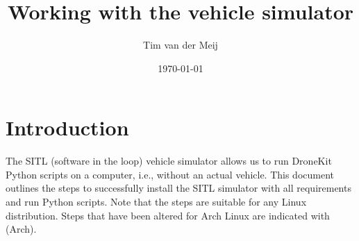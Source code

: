 \documentclass{article}
\newcommand{\arch}{{\color{red} (Arch)}}
\begin{document}
\title{Working with the vehicle simulator}
\author{Tim van der Meij}
\date{\today}

\maketitle

\section*{Introduction}
The SITL (software in the loop) vehicle simulator allows us to run DroneKit Python scripts
on a computer, i.e., without an actual vehicle. This document outlines the steps to successfully
install the SITL simulator with all requirements and run Python scripts. Note that the steps are
suitable for any Linux distribution. Steps that have been altered for Arch Linux are indicated
with \arch{}.
\end{document}
